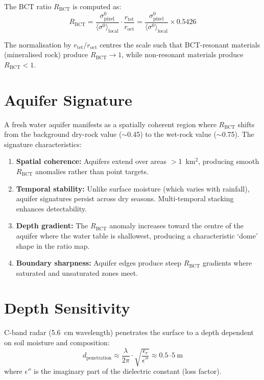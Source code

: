 \documentclass[aps,prl,twocolumn,superscriptaddress]{revtex4-2}
\begin{document}
The BCT ratio $R_{\mathrm{BCT}}$ is computed as:
\begin{equation}
R_{\mathrm{BCT}} = \frac{\sigma^0_{\mathrm{pixel}}}{\langle \sigma^0 \rangle_{\mathrm{local}}} \cdot \frac{r_{\mathrm{tet}}}{r_{\mathrm{oct}}} = \frac{\sigma^0_{\mathrm{pixel}}}{\langle \sigma^0 \rangle_{\mathrm{local}}} \times 0.5426
\end{equation}

The normalisation by $r_{\mathrm{tet}}/r_{\mathrm{oct}}$ centres the scale such that BCT-resonant materials (mineralised rock) produce $R_{\mathrm{BCT}} \to 1$, while non-resonant materials produce $R_{\mathrm{BCT}} < 1$.

\section{Aquifer Signature}

A fresh water aquifer manifests as a spatially coherent region where $R_{\mathrm{BCT}}$ shifts from the background dry-rock value ($\sim$0.45) to the wet-rock value ($\sim$0.75). The signature characteristics:

\begin{enumerate}
\item \textbf{Spatial coherence:} Aquifers extend over areas $>$1~km$^2$, producing smooth $R_{\mathrm{BCT}}$ anomalies rather than point targets.
\item \textbf{Temporal stability:} Unlike surface moisture (which varies with rainfall), aquifer signatures persist across dry seasons. Multi-temporal stacking enhances detectability.
\item \textbf{Depth gradient:} The $R_{\mathrm{BCT}}$ anomaly increases toward the centre of the aquifer where the water table is shallowest, producing a characteristic `dome' shape in the ratio map.
\item \textbf{Boundary sharpness:} Aquifer edges produce steep $R_{\mathrm{BCT}}$ gradients where saturated and unsaturated zones meet.
\end{enumerate}

\section{Depth Sensitivity}

C-band radar (5.6~cm wavelength) penetrates the surface to a depth dependent on soil moisture and composition:
\begin{equation}
d_{\mathrm{penetration}} \approx \frac{\lambda}{2\pi} \cdot \sqrt{\frac{\epsilon_r}{\epsilon''}} \approx 0.5\text{--}5~\text{m}
\end{equation}
where $\epsilon''$ is the imaginary part of the dielectric constant (loss factor).
\end{document}
